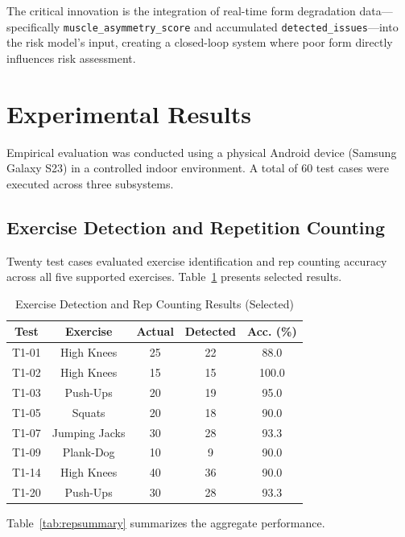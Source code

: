 \documentclass[conference]{IEEEtran}
\begin{document}
The critical innovation is the integration of real-time form degradation data---specifically \texttt{muscle\_asymmetry\_score} and accumulated \texttt{detected\_issues}---into the risk model's input, creating a closed-loop system where poor form directly influences risk assessment.

\section{Experimental Results}

Empirical evaluation was conducted using a physical Android device (Samsung Galaxy S23) in a controlled indoor environment. A total of 60 test cases were executed across three subsystems.

\subsection{Exercise Detection and Repetition Counting}

Twenty test cases evaluated exercise identification and rep counting accuracy across all five supported exercises. Table~\ref{tab:represults} presents selected results.

\begin{table}[htbp]
\caption{Exercise Detection and Rep Counting Results (Selected)}
\begin{center}
\begin{tabular}{|c|c|c|c|c|}
\hline
\textbf{Test} & \textbf{Exercise} & \textbf{Actual} & \textbf{Detected} & \textbf{Acc. (\%)} \\
\hline
T1-01 & High Knees & 25 & 22 & 88.0 \\
T1-02 & High Knees & 15 & 15 & 100.0 \\
T1-03 & Push-Ups & 20 & 19 & 95.0 \\
T1-05 & Squats & 20 & 18 & 90.0 \\
T1-07 & Jumping Jacks & 30 & 28 & 93.3 \\
T1-09 & Plank-Dog & 10 & 9 & 90.0 \\
T1-14 & High Knees & 40 & 36 & 90.0 \\
T1-20 & Push-Ups & 30 & 28 & 93.3 \\
\hline
\end{tabular}
\label{tab:represults}
\end{center}
\end{table}

Table~\ref{tab:repsummary} summarizes the aggregate performance.
\end{document}
